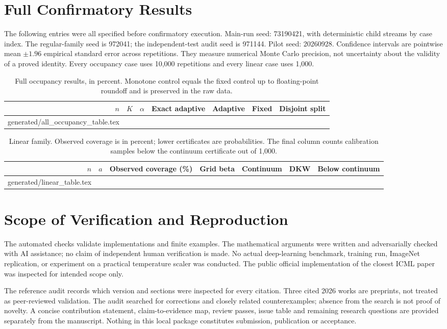 \documentclass{article}
\makeatletter
\newcommand{\inputtable}[1]{\@@input#1 }
\makeatother
\begin{document}
\section{Full Confirmatory Results}\label{app:full}

The following entries were all specified before confirmatory execution. Main-run seed: 73190421, with deterministic child streams by case index. The regular-family seed is 972041; the independent-test audit seed is 971144. Pilot seed: 20260928. Confidence intervals are pointwise mean $\pm1.96$ empirical standard error across repetitions. They measure numerical Monte Carlo precision, not uncertainty about the validity of a proved identity. Every occupancy case uses 10,000 repetitions and every linear case uses 1,000.

\begin{table}[h]
\centering\small
\caption{Full occupancy results, in percent. Monotone control equals the fixed control up to floating-point roundoff and is preserved in the raw data.}
\begin{tabular}{rrrrrrr}
\toprule
$n$ & $K$ & $\alpha$ & Exact adaptive & Adaptive & Fixed & Disjoint split \\
\midrule
\inputtable{generated/all_occupancy_table.tex}
\bottomrule
\end{tabular}
\end{table}

\begin{table}[h]
\centering\small
\caption{Linear family. Observed coverage is in percent; lower certificates are probabilities. The final column counts calibration samples below the continuum certificate out of 1,000.}
\begin{tabular}{rrrrrrr}
\toprule
$n$ & $a$ & Observed coverage (\%) & Grid beta & Continuum & DKW & Below continuum \\
\midrule
\inputtable{generated/linear_table.tex}
\bottomrule
\end{tabular}
\end{table}

\section{Scope of Verification and Reproduction}

The automated checks validate implementations and finite examples. The mathematical arguments were written and adversarially checked with AI assistance; no claim of independent human verification is made. No actual deep-learning benchmark, training run, ImageNet replication, or experiment on a practical temperature scaler was conducted. The public official implementation of the closest ICML paper was inspected for intended scope only.

The reference audit records which version and sections were inspected for every citation. Three cited 2026 works are preprints, not treated as peer-reviewed validation. The audit searched for corrections and closely related counterexamples; absence from the search is not proof of novelty. A concise contribution statement, claim-to-evidence map, review passes, issue table and remaining research questions are provided separately from the manuscript. Nothing in this local package constitutes submission, publication or acceptance.
\end{document}

